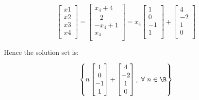\documentclass{article}
\begin{document}
\[
    \begin{bmatrix}
        x1 \\ x2 \\ x3 \\ x4 \\
    \end{bmatrix}
    = 
    \begin{bmatrix}
        x_4 + 4     \\
        -2          \\
        - x_4 + 1   \\
        x_4         \\
    \end{bmatrix}
    = 
    x_4
    \begin{bmatrix}
        1 \\ 0 \\ -1 \\ 1 \\ 
    \end{bmatrix}
    + 
    \begin{bmatrix}
        4 \\ -2 \\ 1 \\ 0 \\
    \end{bmatrix}
\]%

Hence the solution set is:

\[
    \left\{
    n
    \begin{bmatrix}
        1 \\ 0 \\ -1 \\ 1 \\ 
    \end{bmatrix}
    + 
    \begin{bmatrix}
        4 \\ -2 \\ 1 \\ 0 \\
    \end{bmatrix}
    ,
    \ \forall   \ n \in \R
    \right\}
\]%





\end{document}
